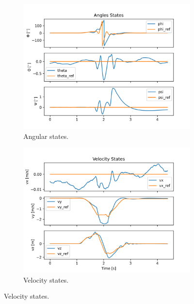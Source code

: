 \documentclass{thesisreport}
\begin{document}
\begin{figure}[H]
\medskip
	\begin{subfigure}{0.43\textwidth}
		\includegraphics[width=\linewidth]{Images/sil_simulations/angleStates.png}
		\caption{Angular states.} \label{fig:SIL_3D_flip_angles}
	\end{subfigure}\hspace*{\fill}
	\begin{subfigure}{0.43\textwidth}
		\includegraphics[width=\linewidth]{Images/sil_simulations/velStates.png}
		\caption{Velocity states.} \label{fig:SIL_3D_flip_velocities}
	\end{subfigure}


\end{figure}
\end{document}
